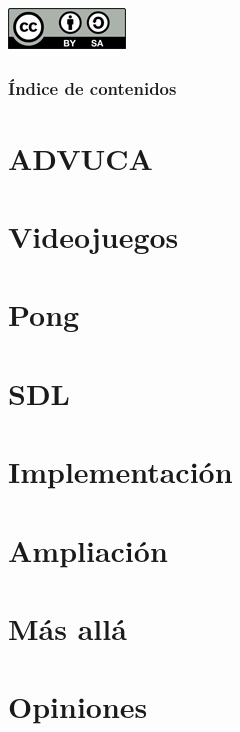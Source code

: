 \documentclass{beamer}
\begin{document}
\begin{frame}
    \begin{center}
        \includegraphics[scale=1]{img/cc.png}
    \end{center}    
\end{frame}

\begin{frame}
	\frametitle{Índice de contenidos}
	\tableofcontents
\end{frame}



\section{ADVUCA}



\section{Videojuegos}


\section{Pong}


\section{SDL}


\section{Implementación}


\section{Ampliación}


\section{Más allá}


\section{Opiniones}

\end{document}
